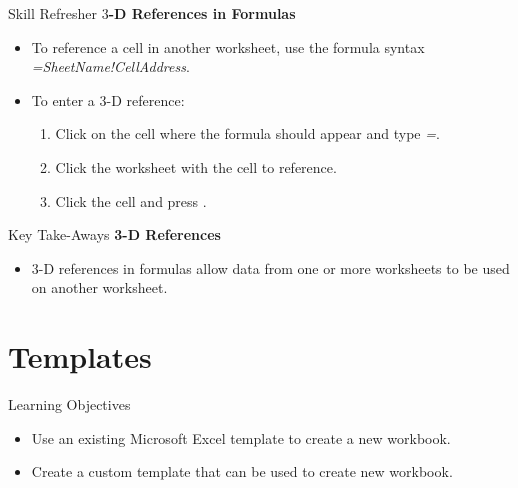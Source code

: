 \begin{center}
	\begin{sklbox}{Skill Refresher}
		\textbf{$ 3 $-D References in Formulas}
		\\
		\begin{itemize}
			\setlength{\itemsep}{0pt}
			\setlength{\parskip}{0pt}
			\setlength{\parsep}{0pt}
			
			\item To reference a cell in another worksheet, use the formula syntax \textit{=SheetName!CellAddress}.
			\bigskip
			\item To enter a $ 3 $-D reference:

			\begin{enumerate}
				\item Click on the cell where the formula should appear and type \textit{=}.
				\item Click the worksheet with the cell to reference.
				\item Click the cell and press .
			\end{enumerate}
			
		\end{itemize}
	\end{sklbox}
\end{center}

\begin{center}
	\begin{tkwbox}{Key Take-Aways}
		\textbf{3-D References}
		\\
		\begin{itemize}
			\setlength{\itemsep}{0pt}
			\setlength{\parskip}{0pt}
			\setlength{\parsep}{0pt}
			
			\item $ 3 $-D references in formulas allow data from one or more worksheets to be used on another worksheet.
			
		\end{itemize}
	\end{tkwbox}
\end{center}

\section{Templates}

\begin{center}
	\begin{objbox}{Learning Objectives}
		\begin{itemize}
			\setlength{\itemsep}{0pt}
			\setlength{\parskip}{0pt}
			\setlength{\parsep}{0pt}

			\item Use an existing Microsoft Excel template to create a new workbook.
			\item Create a custom template that can be used to create new workbook.
		
		\end{itemize}
	\end{objbox}
\end{center}

